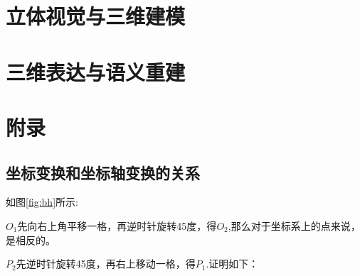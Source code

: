 \documentclass[12pt]{article}
\begin{document}
\section{立体视觉与三维建模}
\newpage
\section{三维表达与语义重建}



\newpage
\section{附录}
\subsection{坐标变换和坐标轴变换的关系}
如图\ref{fig:bh}所示:

$O_1$先向右上角平移一格，再逆时针旋转45度，得$O_2$,那么对于坐标系上的点来说，是相反的。

$P_2$先逆时针旋转45度，再右上移动一格，得$P_1$.证明如下：
\end{document}
